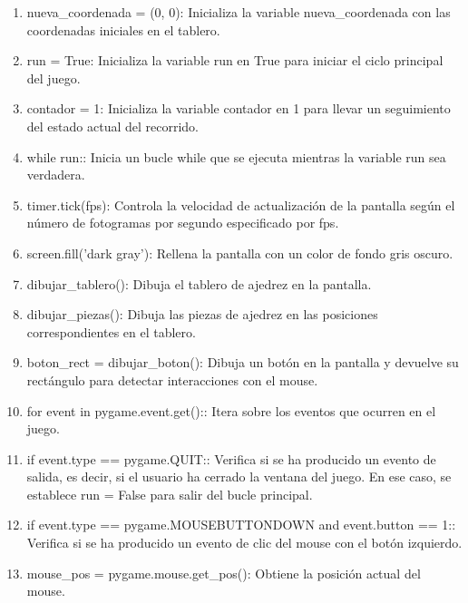 \begin{enumerate}
\begin{enumerate}
\begin{enumerate}
        \item nueva\_coordenada = (0, 0): Inicializa la variable nueva\_coordenada con las coordenadas iniciales en el tablero.\newline
        \item run = True: Inicializa la variable run en True para iniciar el ciclo principal del juego.\newline
        \item contador = 1: Inicializa la variable contador en 1 para llevar un seguimiento del estado actual del recorrido.\newline
        \item while run:: Inicia un bucle while que se ejecuta mientras la variable run sea verdadera.\newline
        \item timer.tick(fps): Controla la velocidad de actualización de la pantalla según el número de fotogramas por segundo especificado por fps.\newline
        \item screen.fill('dark gray'): Rellena la pantalla con un color de fondo gris oscuro.\newline
        \item dibujar\_tablero(): Dibuja el tablero de ajedrez en la pantalla.\newline
        \item dibujar\_piezas(): Dibuja las piezas de ajedrez en las posiciones correspondientes en el tablero.\newline
        \item boton\_rect = dibujar\_boton(): Dibuja un botón en la pantalla y devuelve su rectángulo para detectar interacciones con el mouse.\newline
        \item for event in pygame.event.get():: Itera sobre los eventos que ocurren en el juego.\newline
        \item if event.type == pygame.QUIT:: Verifica si se ha producido un evento de salida, es decir, si el usuario ha cerrado la ventana del juego. En ese caso, se establece run = False para salir del bucle principal.\newline
        \item if event.type == pygame.MOUSEBUTTONDOWN and event.button == 1:: Verifica si se ha producido un evento de clic del mouse con el botón izquierdo.\newline
        \item mouse\_pos = pygame.mouse.get\_pos(): Obtiene la posición actual del mouse.\newline

\end{enumerate}
\end{enumerate}
\end{enumerate}
